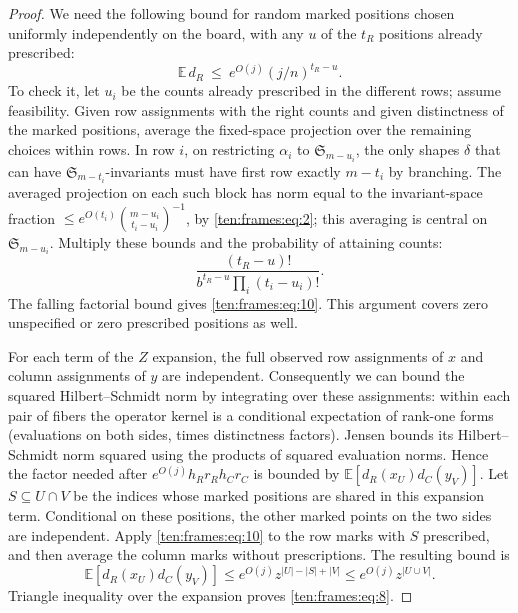 \begin{proof}
We need the following bound for random marked positions chosen uniformly independently on the board, with any \(u\) of the \(t_R\) positions already prescribed:
\begin{equation}
 \mathbb E\,d_R \ \le\ e^{O(j)} (j/n)^{t_R-u}.
 \label{ten:frames:eq:10}
\end{equation}
To check it, let \(u_i\) be the counts already prescribed in the different rows; assume feasibility. Given row assignments with the right counts and given distinctness of the marked positions, average the fixed-space projection over the remaining choices within rows. In row \(i\), on restricting \(\alpha_i\) to \(\mathfrak S_{m-u_i}\), the only shapes \(\delta\) that can have \(\mathfrak S_{m-t_i}\)-invariants must have first row exactly \(m-t_i\) by branching. The averaged projection on each such block has norm equal to the invariant-space fraction \(\le e^{O(t_i)}\binom{m-u_i}{t_i-u_i}^{-1}\), by \eqref{ten:frames:eq:2}; this averaging is central on \(\mathfrak S_{m-u_i}\). Multiply these bounds and the probability of attaining counts:
\[
 \frac{(t_R-u)!}{b^{t_R-u}\prod_i(t_i-u_i)!}.
\]
The falling factorial bound gives \eqref{ten:frames:eq:10}. This argument covers zero unspecified or zero prescribed positions as well.

For each term of the \(Z\) expansion, the full observed row assignments of \(x\) and column assignments of \(y\) are independent. Consequently we can bound the squared Hilbert--Schmidt norm by integrating over these assignments: within each pair of fibers the operator kernel is a conditional expectation of rank-one forms (evaluations on both sides, times distinctness factors). Jensen bounds its Hilbert--Schmidt norm squared using the products of squared evaluation norms. Hence the factor needed after \(e^{O(j)} h_R r_R h_C r_C\) is bounded by \(\mathbb E[d_R(x_U)d_C(y_V)]\). Let $S\subseteq U\cap V$ be the indices whose marked positions are shared in this expansion term. Conditional on these positions, the other marked points on the two sides are independent. Apply \eqref{ten:frames:eq:10} to the row marks with $S$ prescribed, and then average the column marks without prescriptions. The resulting bound is
\[
 \mathbb E[d_R(x_U)d_C(y_V)]
 \le e^{O(j)}z^{|U|-|S|+|V|}
 \le e^{O(j)}z^{|U\cup V|}.
\]
Triangle inequality over the expansion proves \eqref{ten:frames:eq:8}.


\end{proof}
